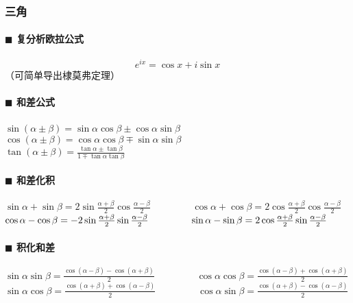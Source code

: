 \subsubsection{三角}
\paragraph{$\blacksquare$ 复分析欧拉公式\\}
$$e^{ix}=\cos x+i\sin x$$（可简单导出棣莫弗定理）
\paragraph{$\blacksquare$ 和差公式\\}
$\sin(\alpha \pm \beta )=\sin \alpha \cos \beta \pm \cos \alpha \sin \beta$~~~~~~~~
$\cos(\alpha \pm \beta )=\cos \alpha \cos \beta \mp \sin \alpha \sin \beta$\\
$\tan(\alpha \pm \beta )={\frac{\tan \alpha \pm \tan \beta }{1\mp \tan \alpha \tan \beta }}$\\
\paragraph{$\blacksquare$ 和差化积\\}
$\sin \alpha +\sin \beta =2\sin {\frac  {\alpha +\beta }{2}}\cos {\frac  {\alpha -\beta }{2}}$~~~~~~~~
$\cos \alpha +\cos \beta =2\cos {\frac  {\alpha +\beta }{2}}\cos {\frac  {\alpha -\beta }{2}}$\\
$\cos \alpha -\cos \beta =-2\sin {\alpha +\beta  \over 2}\sin {\alpha -\beta  \over 2}$~~~~~~~~
$\sin \alpha -\sin \beta =2\cos {\alpha +\beta  \over 2}\sin {\alpha -\beta  \over 2}$\\
\paragraph{$\blacksquare$ 积化和差\\}
$\sin \alpha \sin \beta =\frac{\cos(\alpha -\beta )-\cos(\alpha +\beta )}{2}$~~~~~~~~
$\cos \alpha \cos \beta =\frac{\cos(\alpha -\beta )+\cos(\alpha +\beta )}{2}$\\
$\sin \alpha \cos \beta =\frac{\cos(\alpha +\beta )+\cos(\alpha -\beta )}{2}$~~~~~~~~
$\cos \alpha \sin \beta =\frac{\cos(\alpha +\beta )-\cos(\alpha -\beta )}{2}$\\
